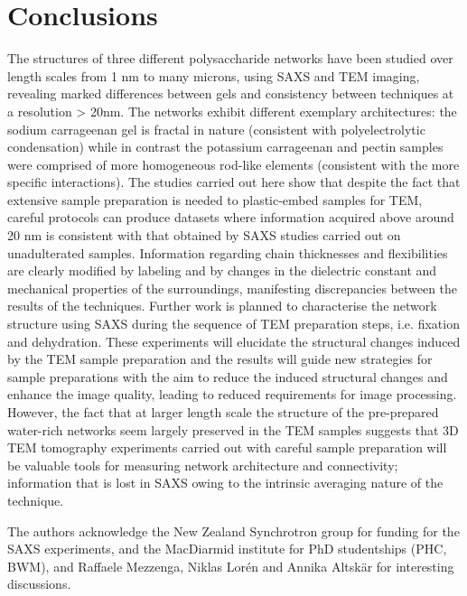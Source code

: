 \section{Conclusions}
The structures of three different polysaccharide networks have been studied over length scales from 1 nm to many microns, using SAXS and TEM imaging, revealing marked differences between gels and consistency between techniques at a resolution > 20nm. The networks exhibit different exemplary architectures: the sodium carrageenan gel is fractal in nature (consistent with polyelectrolytic condensation) while in contrast the potassium carrageenan and pectin samples were comprised of more homogeneous rod-like elements (consistent with the more specific interactions). The studies carried out here show that despite the fact that extensive sample preparation is needed to plastic-embed samples for TEM, careful protocols can produce datasets where information acquired above around 20 nm is consistent with that obtained by SAXS studies carried out on unadulterated samples. Information regarding chain thicknesses and flexibilities are clearly modified by labeling and by changes in the dielectric constant and mechanical properties of the surroundings, manifesting discrepancies between the results of the techniques. Further work is planned to characterise the network structure using SAXS during the sequence of TEM preparation steps, i.e. fixation and dehydration. These experiments will elucidate the structural changes induced by the TEM sample preparation and the results will guide new strategies for sample preparations with the aim to reduce the induced structural changes and enhance the image quality, leading to reduced requirements for image processing. However, the fact that at larger length scale the structure of the pre-prepared water-rich networks seem largely preserved in the TEM samples suggests that 3D TEM tomography experiments carried out with careful sample preparation will be valuable tools for measuring network architecture and connectivity; information that is lost in SAXS owing to the intrinsic averaging nature of the technique. 
 

The authors acknowledge the New Zealand Synchrotron group for funding for the SAXS experiments, and the MacDiarmid institute for PhD studentships (PHC, BWM), and 
Raffaele Mezzenga, Niklas Lor{\'e}n and Annika Altsk{\"a}r for interesting discussions.


